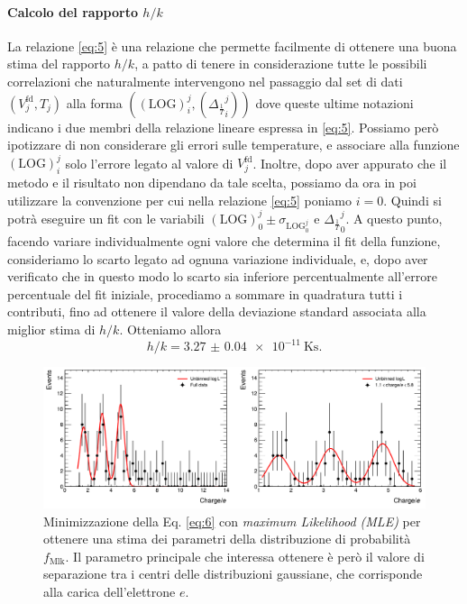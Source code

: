 \documentclass[a4paper, varvw, nofootinbib]{revtex4-2}
\begin{document}
\paragraph*{Calcolo del rapporto $h/k$} La relazione \eqref{eq:5} è una relazione che permette facilmente di ottenere una buona stima del rapporto $h/k$, a patto di tenere in considerazione tutte le possibili correlazioni che naturalmente intervengono nel passaggio dal set di dati $(V_j^\text{fd}, T_j)$ alla forma $((\text{LOG})_i^j, ({\Delta_{\frac{1}{T}}}_i^j))$ dove queste ultime notazioni indicano i due membri della relazione lineare espressa in \eqref{eq:5}. Possiamo però ipotizzare di non considerare gli errori sulle temperature, e associare alla funzione $(\text{LOG})_i^j$ solo l'errore legato al valore di $V_j^\text{fd}$. 
Inoltre, dopo aver appurato che il metodo e il risultato non dipendano da tale scelta, possiamo da ora in poi utilizzare la convenzione per cui nella relazione \eqref{eq:5} poniamo $i=0$. Quindi si potrà eseguire un fit con le variabili $(\text{LOG})_0^j\pm\sigma_\text{LOG$_0^j$}$ e ${\Delta_{\frac{1}{T}}}_0^j$. A questo punto, facendo variare individualmente ogni valore che determina il fit della funzione, consideriamo lo scarto legato ad ognuna variazione individuale, e, dopo aver verificato che in questo modo lo scarto sia inferiore percentualmente all'errore percentuale del fit iniziale, procediamo a sommare in quadratura tutti i contributi, fino ad ottenere il valore della deviazione standard associata alla miglior stima di $h/k$. Otteniamo allora \[h/k = \SI{3.27(4)e-11}{\kelvin\second}.\]

\begin{figure}
\centering
\includegraphics[width=14cm]{fig/millikan}
\caption{Minimizzazione della Eq. \eqref{eq:6} con \emph{maximum Likelihood (MLE)} per ottenere una stima dei parametri della distribuzione di probabilità $f_\text{Mlk}$. Il parametro principale che interessa ottenere è però il valore di separazione tra i centri delle distribuzioni gaussiane, che corrisponde alla carica dell'elettrone $e$.}\label{fig:millikan}
\end{figure}
\end{document}
